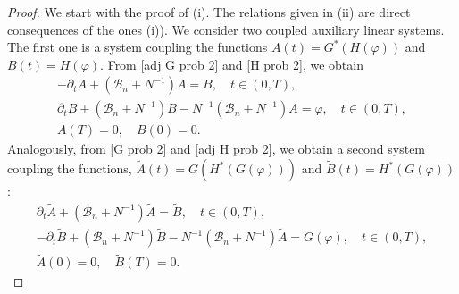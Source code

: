 \documentclass[reqno]{amsart}
\begin{document}
\begin{proof}
We start with the proof of (i). The relations given in (ii)
are direct consequences of the ones (i)). 
We consider two coupled
auxiliary linear systems. The first one is a system coupling the functions 
$A(t)=G^{\ast }(H(\varphi ))$ and $B(t)=H(\varphi )$. From
\eqref{adj G prob 2} and \eqref{H prob 2}, we obtain
\begin{equation}
\begin{gathered}
-\partial _{t}A+(\mathcal{B}_n+N^{-1})A=B, \quad t\in (0,T), \\
\partial _{t}B+(\mathcal{B}_n+N^{-1})B-N^{-1}(\mathcal{B}
_n+N^{-1})A=\varphi , \quad t\in (0,T), \\
A(T)=0,\quad B(0)=0. 
\end{gathered}   \label{lem:func sys 1}
\end{equation}
Analogously, from \eqref{G prob 2} and \eqref{adj H prob 2}, we obtain a second
system coupling the functions, $\tilde{A}(t)=G(H^{\ast }(G(\varphi )))$ and 
$\tilde{B}(t)=H^{\ast }(G(\varphi ))$:
\begin{equation}
\begin{gathered}
\partial _{t}\tilde{A}+(\mathcal{B}_n+N^{-1})\tilde{A}=\tilde{B}, \quad t\in
(0,T), \\
-\partial _{t}\tilde{B}+(\mathcal{B}_n+N^{-1})\tilde{B}-N^{-1}(\mathcal{B}%
_n+N^{-1})\tilde{A}=G(\varphi ), \quad t\in (0,T), \\
\tilde{A}(0)=0,\quad \tilde{B}(T)=0. 
\end{gathered}   \label{lem:func sys 2}
\end{equation}


\end{proof}
\end{document}

